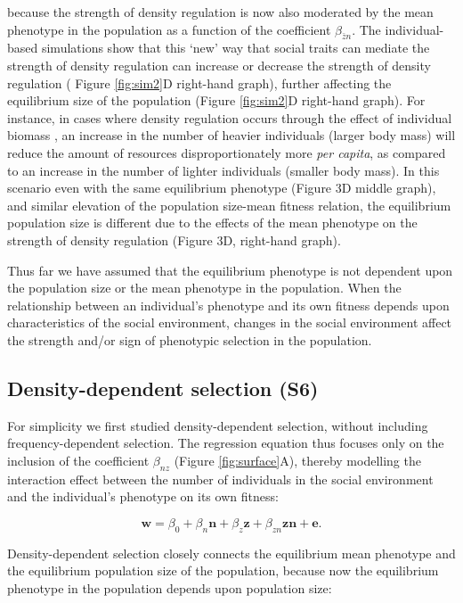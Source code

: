 \documentclass{article}
\begin{document}
\noindent because the strength of density regulation is now also moderated by the mean phenotype in the population as a function of the coefficient  $\beta_{\bar{z}n}$. The individual-based simulations show that this `new' way that social traits can mediate the strength of density regulation can increase or decrease the strength of density regulation ( Figure \ref{fig:sim2}D right-hand graph), further affecting the equilibrium size of the population (Figure \ref{fig:sim2}D right-hand graph). For instance, in cases where density regulation occurs through the effect of individual biomass \citep{Owen-Smith2002}, an increase in the number of heavier individuals (larger body mass) will reduce the amount of resources disproportionately more \textit{per capita}, as compared to an increase in the number of lighter individuals (smaller body mass). In this scenario even with the same equilibrium phenotype (Figure 3D middle graph), and similar elevation of the population size-mean fitness relation, the equilibrium population size is different due to the effects of the mean phenotype on the strength of density regulation (Figure 3D, right-hand graph). 

Thus far we have assumed that the equilibrium phenotype is not dependent upon the population size or the mean phenotype in the population. When the relationship between an individual's phenotype and its own fitness depends upon characteristics of the social environment, changes in the social environment affect the strength and/or sign of phenotypic selection in the population. 
 
 \subsection{Density-dependent selection (S6)}
 For simplicity we first studied density-dependent selection, without including frequency-dependent selection. The regression equation thus focuses only on the inclusion of the coefficient $\beta_{nz}$ (Figure \ref{fig:surface}A), thereby modelling the interaction effect between the number of individuals in the social environment and the individual's phenotype on its own fitness:

\begin{equation} \label{eq: DDRS}
\mathbf{w}=\beta_{0} +\beta_{n} \mathbf{n} + \beta_{z} \mathbf{z}+  \beta_{zn} \mathbf{zn}  +  \mathbf{e}.
\end{equation}

\noindent Density-dependent selection closely connects the equilibrium mean phenotype and the equilibrium population size of the population, because now the equilibrium phenotype in the population depends upon population size:
\end{document}
